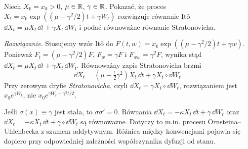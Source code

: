 \begin{zadanie}
Niech $X_0=x_0>0$, $\mu\in\mathbb{R}$, $\gamma\in\mathbb{R}$.
Pokazać, że proces
$X_t=x_0\exp((\mu-\gamma^2/2)t+\gamma W_t)$
rozwiązuje równanie Itô
$\dd X_t=\mu X_t\,\dd t+\gamma X_t\,\dd W_t$
i podać równoważne równanie Stratonovicha.

\emph{Rozwiązanie.} Stosujemy wzór Itô do
$F(t,w)=x_0\exp((\mu-\gamma^2/2)t+\gamma w)$.
Ponieważ $F_t=(\mu-\gamma^2/2)F$,
$F_w=\gamma F$ i $F_{ww}=\gamma^2F$, wynika stąd
$\dd X_t=\mu X_t\,\dd t+\gamma X_t\,\dd W_t$.
Równoważny zapis Stratonovicha brzmi
\[
\dd X_t=(\mu-\tfrac12\gamma^2)X_t\,\dd t
+\gamma X_t\circ\dd W_t.
\]
Przy zerowym dryfie \emph{Stratonovicha}, czyli
$\dd X_t=\gamma X_t\circ\dd W_t$, rozwiązaniem jest
$x_0e^{\gamma W_t}$, nie
$x_0e^{\gamma W_t-\gamma^2t/2}$.
\end{zadanie}

\begin{przyklad}
Jeśli $\sigma(x)\equiv\gamma$ jest stała, to
$\sigma\sigma'=0$. Równania
$\dd X_t=-\kappa X_t\,\dd t+\gamma\,\dd W_t$
oraz
$\dd X_t=-\kappa X_t\,\dd t+\gamma\circ\dd W_t$
są równoważne. Dotyczy to m.in. procesu
Ornsteina--Uhlenbecka z szumem addytywnym.
Różnica między konwencjami pojawia się dopiero przy
odpowiedniej zależności współczynnika dyfuzji od stanu.
\end{przyklad}

